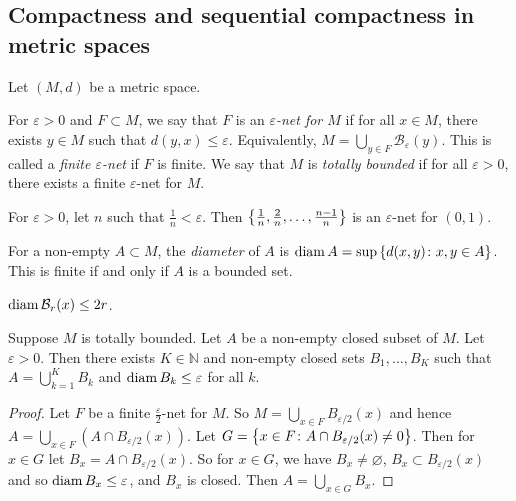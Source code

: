\subsection{Compactness and sequential compactness in metric spaces}
Let \( (M, d) \) be a metric space.
\begin{definition}
	For \( \varepsilon > 0 \) and \( F \subset M \), we say that \( F \) is an \textit{\( \varepsilon \)-net for \( M \)} if for all \( x \in M \), there exists \( y \in M \) such that \( d(y,x) \leq \varepsilon \).
	Equivalently, \( M = \bigcup_{y \in F} \mathcal B_\varepsilon(y) \).
	This is called a \textit{finite \( \varepsilon \)-net} if \( F \) is finite.
	We say that \( M \) is \textit{totally bounded} if for all \( \varepsilon > 0 \), there exists a finite \( \varepsilon \)-net for \( M \).
\end{definition}
\begin{example}
	For \( \varepsilon > 0 \), let \( n \) such that \( \frac{1}{n} < \varepsilon \).
	Then \( \qty{\frac{1}{n}, \frac{2}{n}, \dots, \frac{n-1}{n}} \) is an \( \varepsilon \)-net for \( (0,1) \).
\end{example}
\begin{definition}
	For a non-empty \( A \subset M \), the \textit{diameter} of \( A \) is \( \operatorname{diam} A = \sup\qty{d(x,y) \colon x,y \in A} \).
	This is finite if and only if \( A \) is a bounded set.
\end{definition}
\begin{example}
	\( \operatorname{diam} \mathcal B_r(x) \leq 2r \).
\end{example}
\begin{lemma}
	Suppose \( M \) is totally bounded.
	Let \( A \) be a non-empty closed subset of \( M \).
	Let \( \varepsilon > 0 \).
	Then there exists \( K \in \mathbb N \) and non-empty closed sets \( B_1, \dots, B_K \) such that \( A = \bigcup_{k=1}^K B_k \) and \( \operatorname{diam} B_k \leq \varepsilon \) for all \( k \).
\end{lemma}
\begin{proof}
	Let \( F \) be a finite \( \frac{\varepsilon}{2} \)-net for \( M \).
	So \( M = \bigcup_{x \in F} B_{\varepsilon/2}(x) \) and hence \( A = \bigcup_{x \in F} (A \cap B_{\varepsilon/2}(x)) \).
	Let \( G = \qty{ x \in F \colon A \cap B_{\varepsilon / 2}(x) \neq 0 } \).
	Then for \( x \in G \) let \( B_x = A \cap B_{\varepsilon / 2}(x) \).
	So for \( x \in G \), we have \( B_x \neq \varnothing \), \( B_x \subset B_{\varepsilon/2}(x) \) and so \( \operatorname{diam} B_x \leq \varepsilon \), and \( B_x \) is closed.
	Then \( A = \bigcup_{x \in G} B_x \).
\end{proof}
